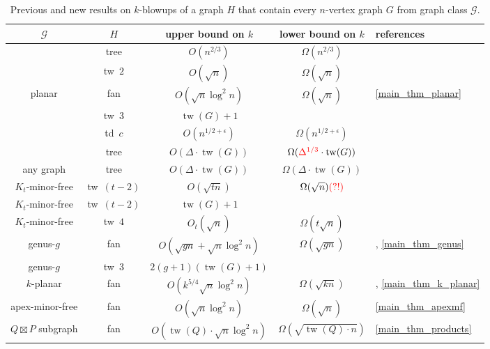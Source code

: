 \documentclass{patmorin}
\makeatletter
\def\mathcolor#1#{\@mathcolor{#1}}
\def\@mathcolor#1#2#3{%
  \protect\leavevmode
  \begingroup
    \color#1{#2}#3%
  \endgroup
}
\DeclareMathOperator{\tw}{tw}
\makeatother
\begin{document}
\begin{table}
  {\centering
  \begin{tabular}{|c|c|c|c|l|} \hline
    $\mathcal{G}$ & $H$ & upper bound on $k$ & lower bound on $k$ & references \\
    \hline\hline
     & tree & $O(n^{2/3})$ & $\Omega(n^{2/3})$ & \cite{LMST08,lipton.tarjan:applications} \\
     & tw~$2$ & $O(\sqrt{n})$ & $\Omega(\sqrt{n})$ & \cite{distel.dujmovic.ea:product} \\
    planar & fan & $O(\sqrt{n}\log^2 n)$ & $\Omega(\sqrt{n})$ & \cref{main_thm_planar} \\
     & tw~$3$ & $\tw(G)+1$ &  & \cite{ISW} \\
     & td~$c$ & $O(n^{1/2+\epsilon})$ & $\Omega(n^{1/2+\epsilon})$ & \cite{DvoWoo} \\
   & tree & $O(\Delta\cdot\tw(G))$ & $\Omega(\mathcolor{red}{\Delta^{1/3}}\cdot\tw(G))$ & \cite{LMST08,ding.oporowski:some} \\
    \hline\hline
     any graph & tree & $O(\Delta\cdot\tw(G))$ & $\Omega(\Delta\cdot\tw(G))$ & \cite{Wood09,ding.oporowski:some} \\
     \hline\hline
    $K_t$-minor-free & tw~$(t-2)$ & $O(\sqrt{tn})$ & $\Omega(\sqrt{n})\mathcolor{red}{(?!)}$ & \cite{ISW} \\
    $K_t$-minor-free & tw~$(t-2)$ & $\tw(G)+1$ &  & \cite{ISW} \\
    $K_t$-minor-free & tw~$4$ & $O_t(\sqrt{n})$ & $\Omega(t\sqrt{n})$ & \cite{distel.dujmovic.ea:product} \\
    genus-$g$ & fan & $O(\sqrt{gn}+\sqrt{n}\log^2 n)$ & $\Omega(\sqrt{gn})$ & \cite{DEW17}, \cref{main_thm_genus} \\
    genus-$g$ & tw~$3$ & $2(g+1)(\tw(G)+1)$ &  & \cite{ISW} \\
    $k$-planar & fan & $O(k^{5/4}\sqrt{n}\log^2 n)$ & $\Omega(\sqrt{kn})$ & \cite{DEW17}, \cref{main_thm_k_planar} \\
    apex-minor-free & fan & $O(\sqrt{n}\log^2 n)$ & $\Omega(\sqrt{n})$ & \cref{main_thm_apexmf} \\
    $Q\boxtimes P$ subgraph & fan & $O(\tw(Q)\cdot\sqrt{n}\log^2 n)$ & $\Omega(\sqrt{\tw(Q)\cdot n})$ & \cref{main_thm_products} \\
    \hline
  \end{tabular}}
  \caption{Previous and new results on $k$-blowups of a graph $H$ that contain every $n$-vertex graph $G$ from graph class $\mathcal{G}$.}\label{results_table}


\end{table}
\end{document}
